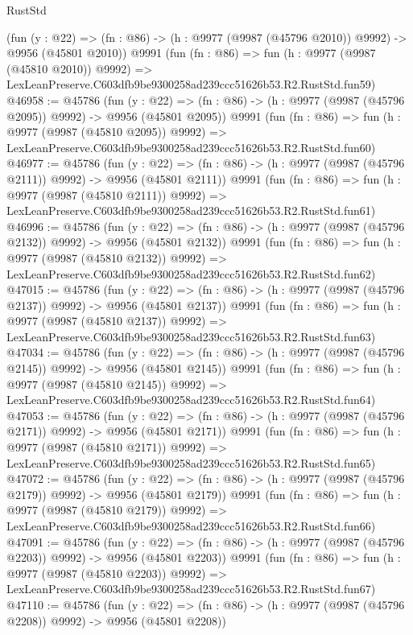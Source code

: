 \begin{lexlean}{RustStd}
\begin{coremodule}
    (fun (y : @22) =>
    (fn : @86) -> (h : @9977 (@9987 (@45796 @2010)) @9992) -> @9956 (@45801 @2010))
    @9991
    (fun (fn : @86) =>
    fun (h : @9977 (@9987 (@45810 @2010)) @9992) =>
    LexLeanPreserve.C603dfb9be9300258ad239ccc51626b53.R2.RustStd.fun59)
@46958 := @45786
    (fun (y : @22) =>
    (fn : @86) -> (h : @9977 (@9987 (@45796 @2095)) @9992) -> @9956 (@45801 @2095))
    @9991
    (fun (fn : @86) =>
    fun (h : @9977 (@9987 (@45810 @2095)) @9992) =>
    LexLeanPreserve.C603dfb9be9300258ad239ccc51626b53.R2.RustStd.fun60)
@46977 := @45786
    (fun (y : @22) =>
    (fn : @86) -> (h : @9977 (@9987 (@45796 @2111)) @9992) -> @9956 (@45801 @2111))
    @9991
    (fun (fn : @86) =>
    fun (h : @9977 (@9987 (@45810 @2111)) @9992) =>
    LexLeanPreserve.C603dfb9be9300258ad239ccc51626b53.R2.RustStd.fun61)
@46996 := @45786
    (fun (y : @22) =>
    (fn : @86) -> (h : @9977 (@9987 (@45796 @2132)) @9992) -> @9956 (@45801 @2132))
    @9991
    (fun (fn : @86) =>
    fun (h : @9977 (@9987 (@45810 @2132)) @9992) =>
    LexLeanPreserve.C603dfb9be9300258ad239ccc51626b53.R2.RustStd.fun62)
@47015 := @45786
    (fun (y : @22) =>
    (fn : @86) -> (h : @9977 (@9987 (@45796 @2137)) @9992) -> @9956 (@45801 @2137))
    @9991
    (fun (fn : @86) =>
    fun (h : @9977 (@9987 (@45810 @2137)) @9992) =>
    LexLeanPreserve.C603dfb9be9300258ad239ccc51626b53.R2.RustStd.fun63)
@47034 := @45786
    (fun (y : @22) =>
    (fn : @86) -> (h : @9977 (@9987 (@45796 @2145)) @9992) -> @9956 (@45801 @2145))
    @9991
    (fun (fn : @86) =>
    fun (h : @9977 (@9987 (@45810 @2145)) @9992) =>
    LexLeanPreserve.C603dfb9be9300258ad239ccc51626b53.R2.RustStd.fun64)
@47053 := @45786
    (fun (y : @22) =>
    (fn : @86) -> (h : @9977 (@9987 (@45796 @2171)) @9992) -> @9956 (@45801 @2171))
    @9991
    (fun (fn : @86) =>
    fun (h : @9977 (@9987 (@45810 @2171)) @9992) =>
    LexLeanPreserve.C603dfb9be9300258ad239ccc51626b53.R2.RustStd.fun65)
@47072 := @45786
    (fun (y : @22) =>
    (fn : @86) -> (h : @9977 (@9987 (@45796 @2179)) @9992) -> @9956 (@45801 @2179))
    @9991
    (fun (fn : @86) =>
    fun (h : @9977 (@9987 (@45810 @2179)) @9992) =>
    LexLeanPreserve.C603dfb9be9300258ad239ccc51626b53.R2.RustStd.fun66)
@47091 := @45786
    (fun (y : @22) =>
    (fn : @86) -> (h : @9977 (@9987 (@45796 @2203)) @9992) -> @9956 (@45801 @2203))
    @9991
    (fun (fn : @86) =>
    fun (h : @9977 (@9987 (@45810 @2203)) @9992) =>
    LexLeanPreserve.C603dfb9be9300258ad239ccc51626b53.R2.RustStd.fun67)
@47110 := @45786
    (fun (y : @22) =>
    (fn : @86) -> (h : @9977 (@9987 (@45796 @2208)) @9992) -> @9956 (@45801 @2208))

\end{coremodule}
\end{lexlean}
